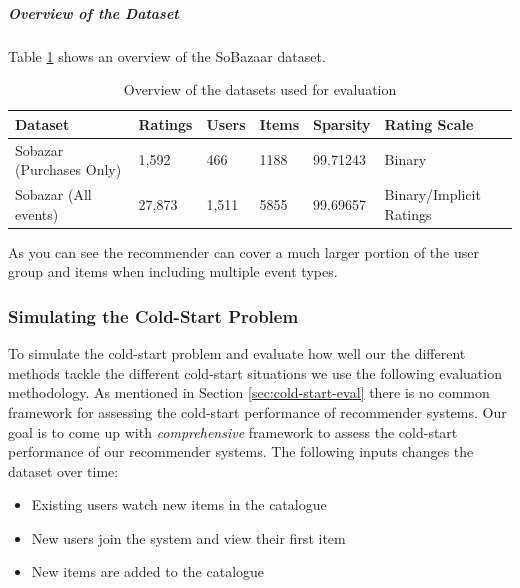 \subparagraph{Overview of the Dataset}

Table \ref{table:datasets} shows an overview of the SoBazaar dataset.


\begin{table}[H]
    \centering
    \begin{tabular}{l l l l l l }
    \toprule
	Dataset						& 	Ratings		& 	Users		& 	Items 		& 	Sparsity			& Rating Scale 				    \\ \midrule
	Sobazar	(Purchases Only) 	&	1,592		&	466			&	1188		&	99.71243			& Binary						\\
	Sobazar (All events)		& 	27,873  	& 	1,511		&	5855		& 	99.69657			& Binary/Implicit Ratings		\\
	\bottomrule
    \end{tabular}
    \caption [Overview of the datasets used for evaluation]{Overview of the datasets used for evaluation}
    \label{table:datasets}
\end{table}

As you can see the recommender can cover a much larger portion of the user group and items when including multiple event types.


\subsubsection{Simulating the Cold-Start Problem}

To simulate the cold-start problem and evaluate how well our the different
methods tackle the different cold-start situations we use the following
evaluation methodology. As mentioned in Section \ref{sec:cold-start-eval} there
is no common framework for assessing the cold-start performance of recommender
systems.  Our goal is to come up with \emph{comprehensive} framework to assess
the cold-start performance of our recommender systems. The following inputs
changes the dataset over time:

\begin{itemize}
	\item 	Existing users watch new items in the catalogue
	\item	New users join the system and view their first item
	\item	New items are added to the catalogue
\end{itemize}

